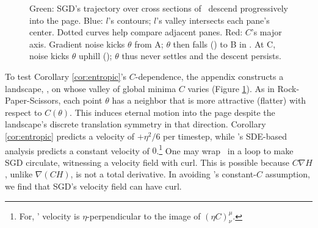 \begin{figure}[h!]
    \squash
    \caption{%
        Green: SGD's trajectory over 
        cross sections of \Helix\ descend progressively
        into the page.  Blue: $l$'s contours; $l$'s valley
        intersects each pane's center.  Dotted
        curves help compare adjacent panes.
        Red: %
        $C$'s
        major axis.
        Gradient noise kicks $\theta$ from A; $\theta$ then falls
        (\hspace{-0.12cm}\protect{}) to B in {\hspace{-0.08cm}\protect{}}.  At C,
        noise kicks $\theta$ uphill (\hspace{-0.08cm}\protect{}); $\theta$
        thus never settles and the descent persists.
    }
    \squash\squash
    \label{fig:archimedes}
\end{figure}

To test Corollary \ref{cor:entropic}'s $C$-dependence,
the appendix %
constructs a landscape, \Helix, on
whose valley of global minima $C$ varies (Figure
\ref{fig:archimedes}).  As in Rock-Paper-Scissors, each point
$\theta$ has a neighbor that is more attractive (flatter) with
respect to $C(\theta)$.  This induces eternal motion into the page
despite the landscape's discrete translation symmetry in that
direction.  Corollary \ref{cor:entropic} predicts a velocity of
$+\eta^2/6$ per timestep, while \cite{ch18}'s SDE-based analysis
predicts a constant velocity of $0$.\footnote{
    For, \Helix' velocity is $\eta$-perpendicular to the image
    of $(\eta C)^\mu_\nu$.%
}
One may wrap \Helix\ in a loop to make SGD circulate,
witnessing a velocity field with curl. %
This is
possible because $C\nabla H$, unlike $\nabla(CH)$, is not a total
derivative. 
In avoiding \cite{we19b}'s constant-$C$ assumption, we 
find that SGD's velocity field can have curl. 

